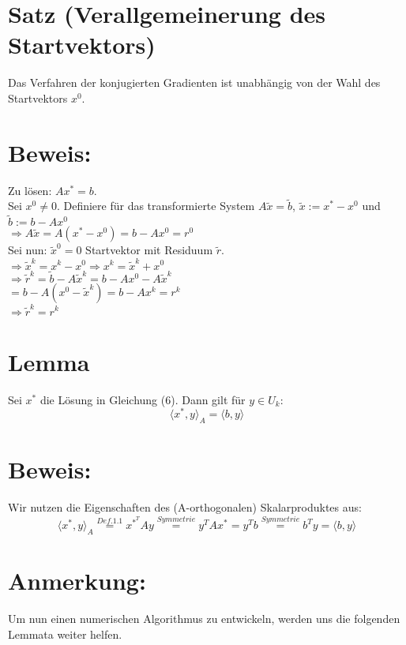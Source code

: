\documentclass{article}
\begin{document}
\section{Satz (Verallgemeinerung des Startvektors)}
Das Verfahren der konjugierten Gradienten ist unabhängig von der Wahl des Startvektors $x^{0}$.

\section{Beweis:}
Zu lösen: $Ax^{*} = b$.
\\Sei $x^{0} \ne 0$. Definiere für das transformierte System $A\tilde x = \tilde b$, $\tilde x := x^{*} - x^{0}$ und $\tilde b := b - Ax^{0}$
\\$\Longrightarrow A\tilde x = A(x^{*} - x^{0}) = b - Ax^{0} = r^{0}$
\\Sei nun: $\tilde x^{0} = 0$ Startvektor mit Residuum $\tilde r$.
\\$\Longrightarrow \tilde x^{k} = x^{k} - x^{0} \Longrightarrow x^{k} = \tilde x^{k} + x^{0}$
\\$\Longrightarrow \tilde r^{k} = \tilde b - A\tilde x^{k} = b - Ax^{0} - A\tilde x^{k}$
\\$= b - A(x^{0} - \tilde x^{k}) = b - Ax^{k} = r^{k}$
\\$\Longrightarrow \tilde r^{k} = r^{k}$

\section{Lemma}
Sei $x^{*}$ die Lösung in Gleichung (6). Dann gilt für $y \in U_{k}$:
\begin{equation}
\langle x^{*}, y \rangle _{A} = \langle b, y \rangle
\end{equation}

\section{Beweis:}
Wir nutzen die Eigenschaften des (A-orthogonalen) Skalarproduktes aus:
\begin{equation*}
\langle x^{*}, y \rangle _{A} \overset{Def. 1.1}{=} x^{{*}^{T}}Ay \overset{Symmetrie}{=} y^{T}Ax^{*} = y^{T}b \overset{Symmetrie}{=} b^{T}y = \langle b, y \rangle
\end{equation*}

\section{Anmerkung:}
Um nun einen numerischen Algorithmus zu entwickeln, werden uns die folgenden Lemmata weiter helfen.
\end{document}
